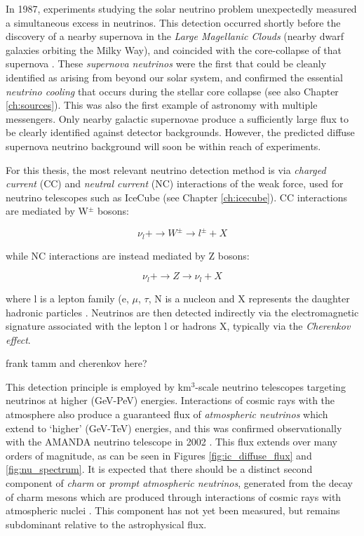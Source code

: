 In 1987, experiments studying the solar neutrino problem unexpectedly measured a simultaneous excess in neutrinos. This detection occurred shortly before the discovery of a nearby supernova in the \emph{Large Magellanic Clouds} (nearby dwarf galaxies orbiting the Milky Way), and coincided with the core-collapse of that supernova . These \emph{supernova neutrinos} were the first that could be cleanly identified as arising from beyond our solar system, and confirmed the essential \emph{neutrino cooling} that occurs during the stellar core collapse (see also Chapter \ref{ch:sources}). This was also the first example of astronomy with multiple messengers. Only nearby galactic supernovae produce a sufficiently large flux to be clearly identified against detector backgrounds. However, the predicted diffuse supernova neutrino background will soon be within reach of experiments.

For this thesis, the most relevant neutrino detection method is via \emph{charged current} (CC) and \emph{neutral current} (NC) interactions of the weak force, used for neutrino telescopes such as IceCube (see Chapter \ref{ch:icecube}). CC interactions are mediated by W$^{\pm}$ bosons:

\begin{equation}
	\nu_{l} + \rightarrow W^{\pm} \rightarrow l^{\pm} + X
\end{equation}

while NC interactions are instead mediated by Z bosons:

\begin{equation}
	\nu_{l} + \rightarrow Z \rightarrow \nu_{l} + X
\end{equation}

where l is a lepton family (e, $\mu$, $\tau$, N is a nucleon and X represents the daughter hadronic particles \cite{spurio_18}. Neutrinos are then detected indirectly via the electromagnetic signature associated with the lepton l or hadrons X, typically via the \emph{Cherenkov effect}. 

frank tamm and cherenkov here?

This detection principle is employed by km$^{3}$-scale neutrino telescopes targeting neutrinos at higher (GeV-PeV) energies. Interactions of cosmic rays with the atmosphere also produce a guaranteed flux of \emph{atmospheric neutrinos} which extend to `higher' (GeV-TeV) energies, and this was confirmed observationally with the AMANDA neutrino telescope in 2002 . This flux extends over many orders of magnitude, as can be seen in Figures \ref{fig:ic_diffuse_flux} and \ref{fig:nu_spectrum}. It is expected that there should be a distinct second component of \emph{charm} or \emph{prompt atmospheric neutrinos}, generated from the decay of charm mesons which are produced through interactions of cosmic rays with atmospheric nuclei \cite{spurio_18}. This component has not yet been measured, but remains subdominant relative to the astrophysical flux.

